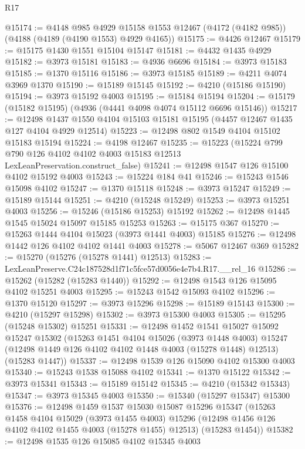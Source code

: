 \begin{lexlean}{R17}
\begin{coremodule}
@15174 := @4148
    @985
    @4929
    @15158
    @1553
    @12467
    (@4172 (@4182 @985))
    (@4188 (@4189 (@4190 @1553) @4929 @4165))
@15175 := @4426 @12467
@15179 := @15175 @1430 @1551 @15104 @15147
@15181 := @4432 @1435 @4929
@15182 := @3973 @15181
@15183 := @4936 @6696
@15184 := @3973 @15183
@15185 := @1370 @15116
@15186 := @3973 @15185
@15189 := @4211 @4074 @3969 @1370
@15190 := @15189 @15145
@15192 := @4210 (@15186 @15190)
@15194 := @3973 @15192 @4003
@15195 := @15184 @15194
@15204 := @15179 (@15182 @15195) (@4936 (@4441 @4098 @4074 @15112 @6696 @15146))
@15217 := @12498 @1437 @1550 @4104 @15103 @15181 @15195 (@4457 @12467 @1435 @127 @4104 @4929 @12514)
@15223 := @12498 @802 @1549 @4104 @15102 @15183 @15194
@15224 := @4198 @12467
@15235 := @15223
    (@15224 @799 @790 @126 @4102 @4102 @4003 @15183 @12513 LexLeanPreservation.construct_false)
@15241 := @12498 @1547 @126 @15100 @4102 @15192 @4003
@15243 := @15224 @184 @41
@15246 := @15243 @1546 @15098 @4102
@15247 := @1370 @15118
@15248 := @3973 @15247
@15249 := @15189 @15144
@15251 := @4210 (@15248 @15249)
@15253 := @3973 @15251 @4003
@15256 := @15246 (@15186 @15253) @15192
@15262 := @12498 @1445 @1545 @15024 @15097 @15185 @15253
@15263 := @15175 @367
@15270 := @15263 @1444 @4104 @15023 (@3973 @1441 @4003) @15185
@15276 := @12498 @1442 @126 @4102 @4102 @1441 @4003
@15278 := @5067 @12467 @369
@15282 := @15270 (@15276 (@15278 @1441) @12513)
@15283 := LexLeanPreserve.C24c187528d1f71c5fce57d0056e4e7b4.R17.__rel_16
@15286 := @15262 (@15282 (@15283 @1440))
@15292 := @12498 @1543 @126 @15095 @4102 @15251 @4003
@15295 := @15243 @1542 @15093 @4102
@15296 := @1370 @15120
@15297 := @3973 @15296
@15298 := @15189 @15143
@15300 := @4210 (@15297 @15298)
@15302 := @3973 @15300 @4003
@15305 := @15295 (@15248 @15302) @15251
@15331 := @12498
    @1452
    @1541
    @15027
    @15092
    @15247
    @15302
    (@15263
      @1451
      @4104
      @15026
      (@3973 @1448 @4003)
      @15247
      (@12498 @1449 @126 @4102 @4102 @1448 @4003 (@15278 @1448) @12513)
      (@15283 @1447))
@15337 := @12498 @1539 @126 @15090 @4102 @15300 @4003
@15340 := @15243 @1538 @15088 @4102
@15341 := @1370 @15122
@15342 := @3973 @15341
@15343 := @15189 @15142
@15345 := @4210 (@15342 @15343)
@15347 := @3973 @15345 @4003
@15350 := @15340 (@15297 @15347) @15300
@15376 := @12498
    @1459
    @1537
    @15030
    @15087
    @15296
    @15347
    (@15263
      @1458
      @4104
      @15029
      (@3973 @1455 @4003)
      @15296
      (@12498 @1456 @126 @4102 @4102 @1455 @4003 (@15278 @1455) @12513)
      (@15283 @1454))
@15382 := @12498 @1535 @126 @15085 @4102 @15345 @4003

\end{coremodule}
\end{lexlean}
